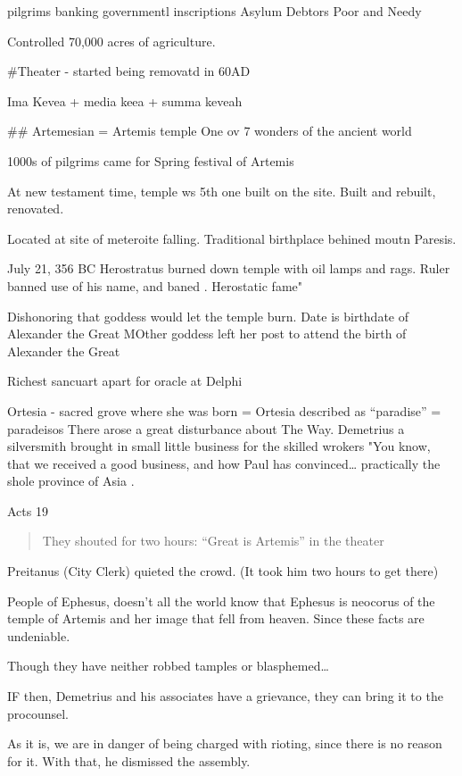 \documentclass[
]{book}
\begin{document}
pilgrims
banking
governmentl inscriptions
Asylum
Debtors
Poor and Needy

Controlled 70,000 acres of agriculture.

\#Theater - started being removatd in 60AD

Ima Kevea + media keea + summa keveah

\#\# Artemesian = Artemis temple One ov 7 wonders of the ancient world

1000s of pilgrims came for Spring festival of Artemis

At new testament time, temple ws 5th one built on the site. Built and rebuilt, renovated.

Located at site of meteroite falling. Traditional birthplace behined moutn Paresis.

July 21, 356 BC Herostratus burned down temple with oil lamps and rags. Ruler banned use of his name, and baned . Herostatic fame"

Dishonoring that goddess would let the temple burn. Date is birthdate of Alexander the Great MOther goddess left her post to attend the birth of Alexander the Great

Richest sancuart apart for oracle at Delphi

Ortesia - sacred grove where she was born = Ortesia described as ``paradise'' = paradeisos
There arose a great disturbance about The Way. Demetrius a silversmith brought in small little business for the skilled wrokers "You know, that we received a good business, and how Paul has convinced\ldots{} practically the shole province of Asia .

Acts 19

\begin{quote}
They shouted for two hours: ``Great is Artemis'' in the theater
\end{quote}

Preitanus (City Clerk) quieted the crowd. (It took him two hours to get there)

People of Ephesus, doesn't all the world know that Ephesus is neocorus of the temple of Artemis and her image that fell from heaven. Since these facts are undeniable.

Though they have neither robbed tamples or blasphemed\ldots{}

IF then, Demetrius and his associates have a grievance, they can bring it to the procounsel.

As it is, we are in danger of being charged with rioting, since there is no reason for it. With that, he dismissed the assembly.
\end{document}
